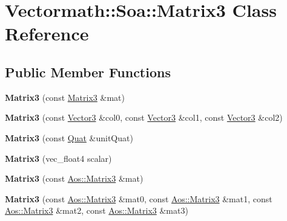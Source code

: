 \hypertarget{classVectormath_1_1Soa_1_1Matrix3}{\section{Vectormath\-:\-:Soa\-:\-:Matrix3 Class Reference}
\label{classVectormath_1_1Soa_1_1Matrix3}
}
\subsection*{Public Member Functions}
\begin{DoxyCompactItemize}
\item 
\hypertarget{classVectormath_1_1Soa_1_1Matrix3_a4ab9fc5d4e0b2bb2a48ed18070affd32}{{\bfseries Matrix3} (const \hyperlink{classVectormath_1_1Soa_1_1Matrix3}{Matrix3} \&mat)}\label{classVectormath_1_1Soa_1_1Matrix3_a4ab9fc5d4e0b2bb2a48ed18070affd32}

\item 
\hypertarget{classVectormath_1_1Soa_1_1Matrix3_a737743e03f4c6e06e82f8b3a721facb9}{{\bfseries Matrix3} (const \hyperlink{classVectormath_1_1Soa_1_1Vector3}{Vector3} \&col0, const \hyperlink{classVectormath_1_1Soa_1_1Vector3}{Vector3} \&col1, const \hyperlink{classVectormath_1_1Soa_1_1Vector3}{Vector3} \&col2)}\label{classVectormath_1_1Soa_1_1Matrix3_a737743e03f4c6e06e82f8b3a721facb9}

\item 
\hypertarget{classVectormath_1_1Soa_1_1Matrix3_a6577384ec4233a1b75128a553a547c07}{{\bfseries Matrix3} (const \hyperlink{classVectormath_1_1Soa_1_1Quat}{Quat} \&unit\-Quat)}\label{classVectormath_1_1Soa_1_1Matrix3_a6577384ec4233a1b75128a553a547c07}

\item 
\hypertarget{classVectormath_1_1Soa_1_1Matrix3_a63631bd9d1a83a4994c171f72d20e557}{{\bfseries Matrix3} (vec\-\_\-float4 scalar)}\label{classVectormath_1_1Soa_1_1Matrix3_a63631bd9d1a83a4994c171f72d20e557}

\item 
\hypertarget{classVectormath_1_1Soa_1_1Matrix3_a52a266e8f2a168841f8f0ceb1fb04925}{{\bfseries Matrix3} (const \hyperlink{classVectormath_1_1Aos_1_1Matrix3}{Aos\-::\-Matrix3} \&mat)}\label{classVectormath_1_1Soa_1_1Matrix3_a52a266e8f2a168841f8f0ceb1fb04925}

\item 
\hypertarget{classVectormath_1_1Soa_1_1Matrix3_a75c2a4c51656114a590ed1e5fc222d95}{{\bfseries Matrix3} (const \hyperlink{classVectormath_1_1Aos_1_1Matrix3}{Aos\-::\-Matrix3} \&mat0, const \hyperlink{classVectormath_1_1Aos_1_1Matrix3}{Aos\-::\-Matrix3} \&mat1, const \hyperlink{classVectormath_1_1Aos_1_1Matrix3}{Aos\-::\-Matrix3} \&mat2, const \hyperlink{classVectormath_1_1Aos_1_1Matrix3}{Aos\-::\-Matrix3} \&mat3)}\label{classVectormath_1_1Soa_1_1Matrix3_a75c2a4c51656114a590ed1e5fc222d95}


\end{DoxyCompactItemize}
